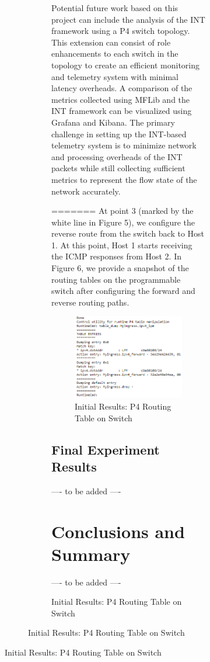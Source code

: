 \documentclass[conference]{IEEEtran}
\begin{document}
\begin{figure}[h!]
\begin{figure}[b]
\begin{figure}[t]
    Potential future work based on this project can include the analysis of the INT framework using a P4 switch topology. This extension can consist of role enhancements to each switch in the topology to create an efficient monitoring and telemetry system with minimal latency overheads. A comparison of the metrics collected using MFLib and the INT framework can be visualized using Grafana and Kibana. The primary challenge in setting up the INT-based telemetry system is to minimize network and processing overheads of the INT packets while still collecting sufficient metrics to represent the flow state of the network accurately.

=======
    At point 3 (marked by the white line in Figure 5), we configure the reverse route from the switch back to Host 1. At this point, Host 1 starts receiving the ICMP responses from Host 2. In Figure 6, we provide a snapshot of the routing tables on the programmable switch after configuring the forward and reverse routing paths.

    \begin{figure}[t]
        \includegraphics[scale=0.4]{Switch_Routing_Table.png}
        \centering
        \caption{Initial Results: P4 Routing Table on Switch}
    \end{figure}

    \subsection{Final Experiment Results}
    ---- to be added ----

    \section{Conclusions and Summary}
    ---- to be added ----


\end{figure}
\end{figure}
\end{figure}
\end{document}

